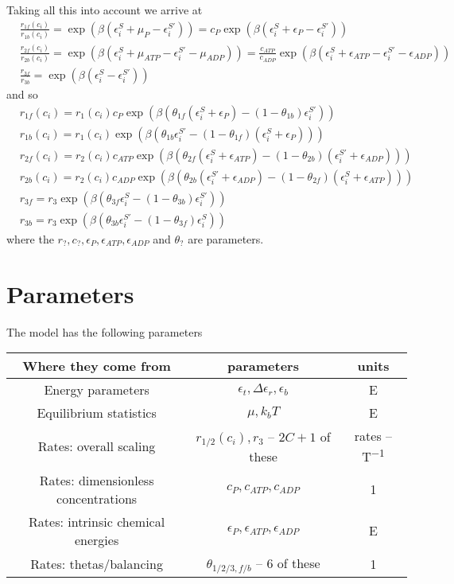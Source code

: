 \documentclass[11pt]{article}
\begin{document}
Taking all this into account we arrive at
\begin{align}
    &\frac{r_{1f}(c_i)}{r_{1b}(c_i)} = \exp(\beta(\epsilon_i^S+\mu_P-\epsilon_i^{S'})) = c_P\exp(\beta(\epsilon_i^S+\epsilon_P-\epsilon_i^{S'})) \\
    &\frac{r_{2f}(c_i)}{r_{2b}(c_i)} = \exp(\beta(\epsilon_i^S+\mu_{ATP}-\epsilon_i^{S'}-\mu_{ADP})) = \frac{c_{ATP}}{c_{ADP}}\exp(\beta(\epsilon_i^S+\epsilon_{ATP}-\epsilon_i^{S'}-\epsilon_{ADP})) \\
    &\frac{r_{3f}}{r_{3b}} = \exp(\beta(\epsilon_i^S-\epsilon_i^{S'}))
\end{align}
and so
\begin{align}
    &r_{1f}(c_i) = r_1(c_i)c_P\exp(\beta(\theta_{1f}(\epsilon_i^S+\epsilon_P)-(1-\theta_{1b})\epsilon_i^{S'})) \label{eq:rate1f} \\
    &r_{1b}(c_i) = r_1(c_i)\exp(\beta(\theta_{1b}\epsilon_i^{S'}-(1-\theta_{1f})(\epsilon_i^S+\epsilon_P))) \label{eq:rate1b} \\
    &r_{2f}(c_i) = r_2(c_i)c_{ATP}\exp(\beta(\theta_{2f}(\epsilon_i^S+\epsilon_{ATP})-(1-\theta_{2b})(\epsilon_i^{S'}+\epsilon_{ADP}))) \label{eq:rate2f} \\
    &r_{2b}(c_i) = r_2(c_i)c_{ADP}\exp(\beta(\theta_{2b}(\epsilon_i^{S'}+\epsilon_{ADP})-(1-\theta_{2f})(\epsilon_i^S+\epsilon_{ATP}))) \label{eq:rate2b} \\
    &r_{3f} = r_3\exp(\beta(\theta_{3f}\epsilon_i^S-(1-\theta_{3b})\epsilon_i^{S'})) \label{eq:rate3f} \\
    &r_{3b} = r_3\exp(\beta(\theta_{3b}\epsilon_i^{S'}-(1-\theta_{3f})\epsilon_i^S)) \label{eq:rate3b}
\end{align}
where the $r_?,c_?,\epsilon_P,\epsilon_{ATP},\epsilon_{ADP}$ and $\theta_?$ are parameters.

\section{Parameters}
The model has the following parameters
\begin{table}[H]
    \centering
    \begin{tabular}{c|c|c}
        Where they come from & parameters & units \\
        \hline
        Energy parameters & $\epsilon_t, \Delta\epsilon_r, \epsilon_b$ & \si{E} \\
        Equilibrium statistics & $\mu, \si{k_b}T$ & \si{E} \\
        Rates: overall scaling & $r_{1/2}(c_i),r_3$ -- $2C+1$ of these & rates -- \si{T^{-1}} \\
        Rates: dimensionless concentrations & $c_P,c_{ATP},c_{ADP}$ & \si{1} \\
        Rates: intrinsic chemical energies & $\epsilon_P,\epsilon_{ATP},\epsilon_{ADP}$ & \si{E} \\
        Rates: thetas/balancing & $\theta_{1/2/3,f/b}$ -- 6 of these & \si{1} \\
    \end{tabular}
\end{table}
\end{document}
